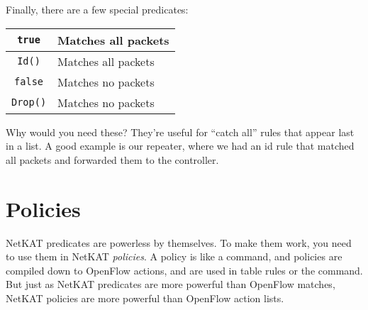 Finally, there are a few special predicates:

\bigskip
\begin{tabularx}{\linewidth}{|c|X|}
\hline\hline
\texttt{true} & Matches all packets
\\ \hline  
\texttt{Id()} & Matches all packets
\\ \hline  
\texttt{false} & Matches no packets
\\ \hline  
\texttt{Drop()} & Matches no packets
\\ \hline\hline
\end{tabularx}
\bigskip

Why would you need these?  
They're useful for ``catch all'' rules that appear last in a list.
A good example is our repeater, where we had an id rule that matched all packets and
forwarded them to the controller.

\section{Policies}

NetKAT predicates are powerless by themselves.  
To make them work, you need to use them in NetKAT \textit{policies}.
A policy is like a command, and policies are compiled down to OpenFlow actions, 
and are used in table rules or the  command.  
But just as NetKAT predicates are more powerful than OpenFlow matches, NetKAT policies are more
powerful than OpenFlow action lists.

